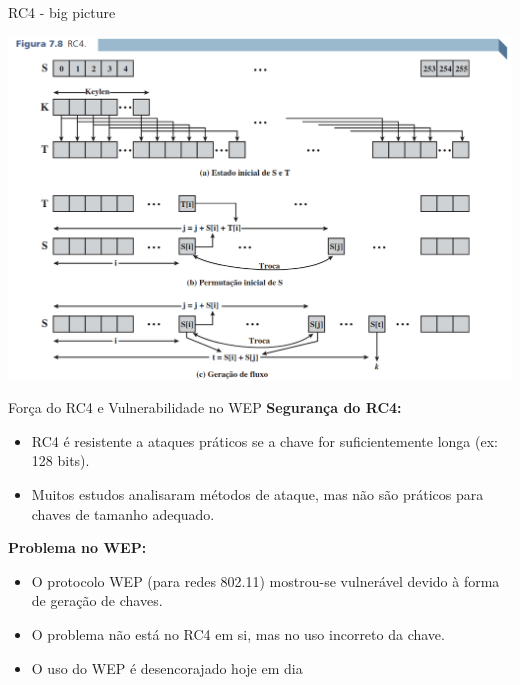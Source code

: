 \begin{frame}{RC4 - big picture}

    
\centering
    \includegraphics[width=0.75\linewidth]{Figuras/rc4-big-picture.png}



\end{frame}


\begin{frame}{Força do RC4 e Vulnerabilidade no WEP}
\textbf{Segurança do RC4:}
\begin{itemize}
    \item RC4 é resistente a ataques práticos se a chave for suficientemente longa (ex: 128 bits).
    \item Muitos estudos analisaram métodos de ataque, mas não são práticos para chaves de tamanho adequado.
\end{itemize}

\textbf{Problema no WEP:}
\begin{itemize}
    \item O protocolo WEP (para redes 802.11) mostrou-se vulnerável devido à forma de geração de chaves.
    \item O problema não está no RC4 em si, mas no uso incorreto da chave.
    \item O uso do WEP é desencorajado hoje em dia
\end{itemize}


\end{frame}

